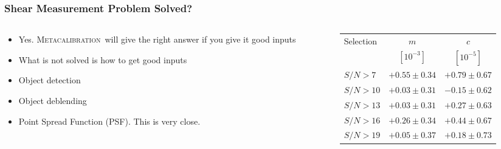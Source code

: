 \documentclass[aspectratio=169]{beamer}
\newcommand{\Mcal}{\textsc{Metacalibration}}
\newcommand{\snr}{$S/N$}
\begin{document}
\frame
{

    \frametitle{Shear Measurement Problem Solved?}


    \begin{columns}
        \begin{column}{0.4\textwidth}
            \begin{itemize}

                \item Yes. \Mcal\ will give the right answer if you
                    give it good inputs

                \item What is not solved is how to get good inputs

                \item Object detection

                \item Object deblending

                \item Point Spread Function (PSF). This is very close.

            \end{itemize}

        \end{column}
        \begin{column}{0.6\textwidth}

            \begin{table}
                \centering
                \begin{tabular}{ l cc}
                    \hline
                    Selection   &      $m$               & $c$  \\
                                    & $[10^{-3}]$     & $[10^{-5}]$  \\
                    \hline
                    \hline
                    \rule{0pt}{3ex}$\mbox{\snr} > 7 $ & $+0.55 \pm 0.34$ & $+0.79 \pm 0.67$ \\
                    $\mbox{\snr} > 10 $ & $+0.03 \pm 0.31$ & $-0.15 \pm 0.62$ \\
                    $\mbox{\snr} > 13 $ & $+0.03 \pm 0.31$ & $+0.27 \pm 0.63$ \\
                    $\mbox{\snr} > 16 $ & $+0.26 \pm 0.34$ & $+0.44 \pm 0.67$ \\
                    $\mbox{\snr} > 19 $ & $+0.05 \pm 0.37$ & $+0.18 \pm 0.73$ \\
                    \hline
                \end{tabular}

            \end{table}




        \end{column}

    \end{columns}

}
\end{document}
